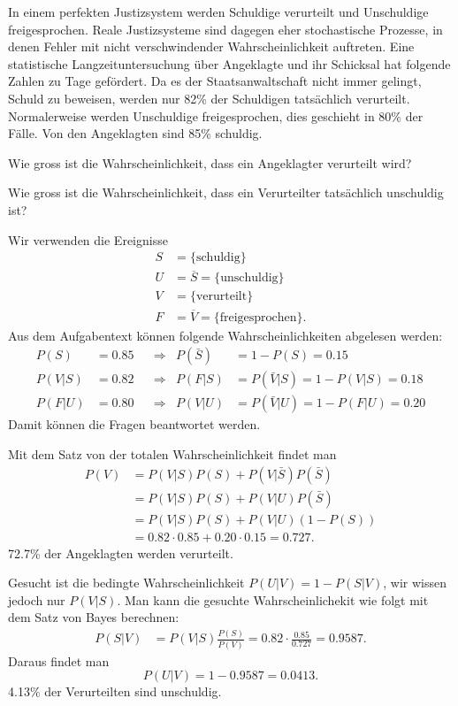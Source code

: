In einem perfekten Justizsystem werden Schuldige verurteilt und
Unschuldige freigesprochen.
Reale Justizsysteme sind dagegen eher stochastische Prozesse, in denen
Fehler mit nicht verschwindender Wahrscheinlichkeit auftreten.
Eine statistische Langzeituntersuchung über Angeklagte und ihr Schicksal
hat folgende Zahlen zu Tage gefördert.
Da es der Staatsanwaltschaft nicht immer gelingt, Schuld zu beweisen,
werden nur 82\% der Schuldigen tatsächlich verurteilt.
Normalerweise werden Unschuldige freigesprochen, dies geschieht in
80\% der Fälle.
Von den Angeklagten sind 85\% schuldig.

\begin{teilaufgaben}
\item
Wie gross ist die Wahrscheinlichkeit, dass ein Angeklagter 
verurteilt wird?
\item
Wie gross ist die Wahrscheinlichkeit, dass ein Verurteilter tatsächlich
unschuldig ist?
\end{teilaufgaben}

\begin{loesung}
Wir verwenden die Ereignisse
\begin{align*}
S&=             \{\text{schuldig}\}      \\
U&=\overline{S}=\{\text{unschuldig}\}    \\
V&=             \{\text{verurteilt}\}    \\
F&=\overline{V}=\{\text{freigesprochen}\}.
\end{align*}
Aus dem Aufgabentext können folgende Wahrscheinlichkeiten abgelesen
werden:
\[
\begin{aligned}
P(S)   &= 0.85 &&\Rightarrow& P(\bar{S}) &= 1- P(S) = 0.15 \\
P(V|S) &= 0.82 &&\Rightarrow&     P(F|S) &= P(\bar{V}|S) = 1-P(V|S) = 0.18 \\
P(F|U) &= 0.80 &&\Rightarrow&     P(V|U) &= P(\bar{V}|U) = 1-P(F|U) = 0.20
\end{aligned}
\]
Damit können die Fragen beantwortet werden.
\begin{teilaufgaben}
\item
Mit dem Satz von der totalen Wahrscheinlichkeit findet man
\begin{align*}
P(V)
&=
P(V|S) P(S) + P(V|\bar{S}) P(\bar{S})
\\
&=
P(V|S) P(S) + P(V|U) P(\bar S)
\\
&=
P(V|S) P(S) + P(V|U) (1-P(S))
\\
&=
0.82\cdot 0.85 + 0.20\cdot 0.15
=
0.727.
\end{align*}
72.7\% der Angeklagten werden verurteilt.
\item
Gesucht ist die bedingte Wahrscheinlichkeit $P(U|V)=1-P(S|V)$,
wir wissen jedoch nur $P(V|S)$.
Man kann die gesuchte Wahrscheinlichekit
wie folgt mit dem Satz von Bayes berechnen:
\begin{align*}
P(S|V)
&=
P(V|S)\frac{P(S)}{P(V)}
=
0.82\cdot\frac{0.85}{0.727}
=
0.9587.
\end{align*}
Daraus  findet man
\[
P(U|V) = 1-0.9587 = 0.0413.
\]
4.13\% der Verurteilten sind unschuldig.
\qedhere
\end{teilaufgaben}
\end{loesung}

